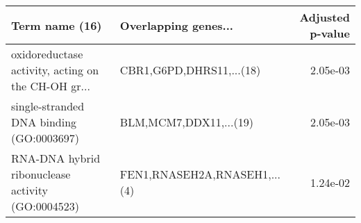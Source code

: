 \begin{tabular}{llr}
\toprule
                                    Term name (16) &         Overlapping genes... &  Adjusted p-value \\
\midrule
oxidoreductase activity, acting on the CH-OH gr... &     CBR1,G6PD,DHRS11,...(18) &          2.05e-03 \\
          single-stranded DNA binding (GO:0003697) &       BLM,MCM7,DDX11,...(19) &          2.05e-03 \\
 RNA-DNA hybrid ribonuclease activity (GO:0004523) & FEN1,RNASEH2A,RNASEH1,...(4) &          1.24e-02 \\
\bottomrule
\end{tabular}
